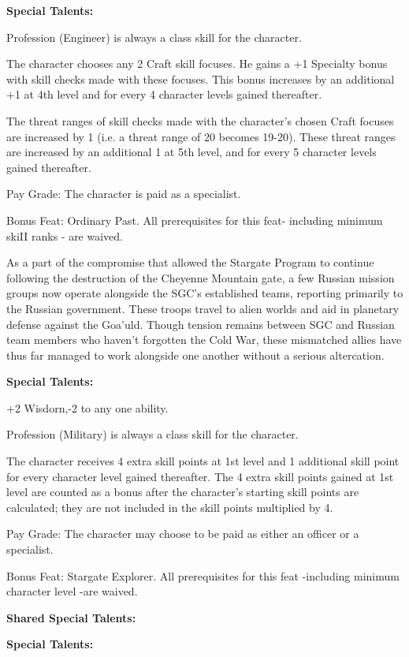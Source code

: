 \textbf{Special Talents:}
\begin{itemize*}
\item Profession (Engineer) is always a class skill for the character.
\item The character chooses any 2 Craft skill focuses. He gains a +1 Specialty bonus with skill checks made with these focuses. This bonus increases by an additional +1 at 4th level and for every 4 character levels gained thereafter.
\item The threat ranges of skill checks made with the character's chosen Craft focuses are increased by 1 (i.e. a threat range of 20 becomes 19-20). These threat ranges are increased by an additional 1 at 5th level, and for every 5 character levels gained thereafter.
\item Pay Grade: The character is paid as a specialist.
\item Bonus Feat: Ordinary Past. All prerequisites for this feat- including minimum skiII ranks - are waived.
\end{itemize*}

As a part of the compromise that allowed the Stargate Program to continue following the destruction of the Cheyenne Mountain gate, a few Russian mission groups now operate alongside the SGC's established teams, reporting primarily to the Russian government. These troops travel to alien worlds and aid in planetary defense against the Goa'uld. Though tension remains between SGC and Russian team members who haven't forgotten the Cold War, these mismatched allies have thus far managed to work alongside one another without a serious altercation.

\textbf{Special Talents:}
\begin{itemize*}
\item +2 Wisdorn,-2 to any one ability.
\item Profession (Military) is always a class skill for the character.
\item The character receives 4 extra skill points at 1st level and 1 additional skill point for every character level gained thereafter. The 4 extra skill points gained at 1st level are counted as a bonus after the character's starting skill points are calculated; they are not included in the skill points multiplied by 4.
\item Pay Grade: The character may choose to be paid as either an officer or a specialist.
\item Bonus Feat: Stargate Explorer. All prerequisites for this feat -including minimum character level -are waived.
\end{itemize*}




\textbf{Shared Special Talents:}
\begin{itemize*}
\item 
\item 
\end{itemize*}




\textbf{Special Talents:}
\begin{itemize*}
\item 
\item 
\item 
\item 
\end{itemize*}

